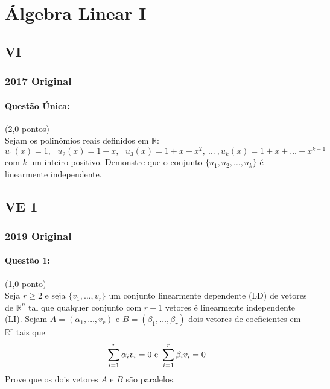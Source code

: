 \documentclass[12pt,a4paper]{article}
\newcommand{\original}[1]{\tiny \href{#1}{Original} \normalsize}
\begin{document}
\newpage

\section{Álgebra Linear I}

\subsection{VI}
\subsubsection{2017 \original{https://drive.google.com/file/d/1QADTZEY0qs7DyY9__lcWPd54k74lXG3r/view?usp=sharing}}
\paragraph{Questão Única:} (2,0 pontos)\\
Sejam os polinômios reais definidos em $\mathbb{R}$:
$$u_1(x)=1, \ \ \ u_2(x)=1+x, \ \ \ u_3(x)=1+x+x^2,\ . . . \ , u_k(x)=1+x+\dots+x^{k-1}$$
com $k$ um inteiro positivo. Demonstre que o conjunto $\{u_1,u_2,\dots,u_k\}$ é linearmente independente.
\newpage
\subsection{VE 1}

\subsubsection{2019 \original{https://drive.google.com/open?id=1hLRvBgNvdTu0GubhBeQP4kDxIlHchgam}}

\paragraph{Questão 1:} (1,0 ponto)\\
Seja $r \geq 2$ e seja $\{v_1, \dots, v_r\}$ um conjunto linearmente dependente (LD) de vetores de $\mathbb{R}^n$ tal que qualquer conjunto com $r-1$ vetores é linearmente independente (LI). Sejam $A = (\alpha_1, \dots, v_r)$ e $B= (\beta_1, \dots, \beta_r)$ dois vetores de coeficientes em $\mathbb{R}^r$ tais que 
\begin{equation*}
    \sum_{i=1}^{r} \alpha_iv_i = 0 \textnormal{     e    }  \sum_{i=1}^{r} \beta_iv_i = 0
\end{equation*} 
Prove que os dois vetores $A$ e $B$ são paralelos.

\vspace{2.0cm}
\end{document}
